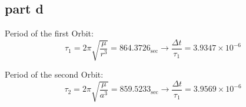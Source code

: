 \subsection{part d}
Period of the first Orbit:
$$
\tau_1 = 2\pi\sqrt{\dfrac{\mu}{r^3}} = 864.3726_{\sec} \to \dfrac{\Delta t}{\tau_1} = 3.9347\times10^{-6}
$$

Period of the second Orbit:
$$
\tau_2 = 2\pi\sqrt{\dfrac{\mu}{a^3}} = 859.5233_{\sec} \to \dfrac{\Delta t}{\tau_1} = 3.9569\times10^{-6}
$$
